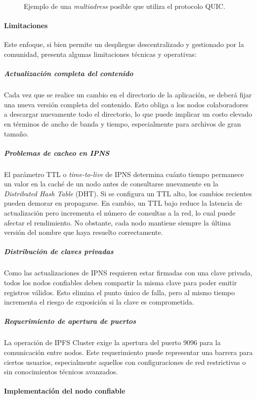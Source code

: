 \begin{figure}[H]
\centering
{}
\caption{Ejemplo de una \textit{multiadress} posible que utiliza el protocolo QUIC.}
\end{figure}

\paragraph{Limitaciones}

Este enfoque, si bien permite un despliegue descentralizado y gestionado por la comunidad, presenta algunas limitaciones técnicas y operativas:

\subparagraph{Actualización completa del contenido} Cada vez que se realice un cambio en el directorio de la aplicación, se deberá fijar una nueva versión completa del contenido. Esto obliga a los nodos colaboradores a descargar nuevamente todo el directorio, lo que puede implicar un costo elevado en términos de ancho de banda y tiempo, especialmente para archivos de gran tamaño.

\subparagraph{Problemas de cacheo en IPNS} El parámetro TTL o \textit{time-to-live} de IPNS determina cuánto tiempo permanece un valor en la caché de un nodo antes de consultarse nuevamente en la \textit{Distributed Hash Table} (DHT). Si se configura un TTL alto, los cambios recientes pueden demorar en propagarse. En cambio, un TTL bajo reduce la latencia de actualización pero incrementa el número de consultas a la red, lo cual puede afectar el rendimiento. No obstante, cada nodo mantiene siempre la última versión del nombre que haya resuelto correctamente.

\subparagraph{Distribución de claves privadas} Como las actualizaciones de IPNS requieren estar firmadas con una clave privada, todos los nodos confiables deben compartir la misma clave para poder emitir registros válidos. Esto elimina el punto único de falla, pero al mismo tiempo incrementa el riesgo de exposición si la clave es comprometida.

\subparagraph{Requerimiento de apertura de puertos} La operación de IPFS Cluster exige la apertura del puerto 9096 para la comunicación entre nodos. Este requerimiento puede representar una barrera para ciertos usuarios, especialmente aquellos con configuraciones de red restrictivas o sin conocimientos técnicos avanzados.

\paragraph{Implementación del nodo confiable}

